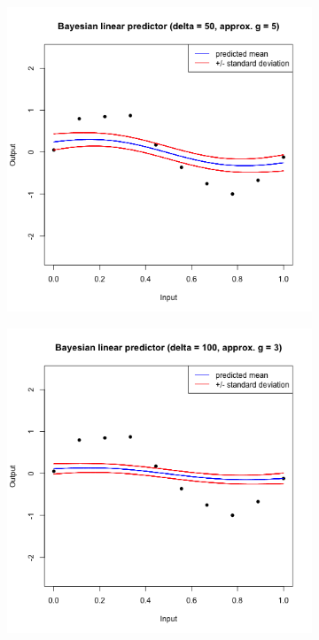 \documentclass[a4paper, 11pt]{article}
\begin{document}
\begin{figure}[H]
\centering
\begin{subfigure}{.5\textwidth}
  \centering
  \includegraphics[width=1\linewidth]{ps3F_plot10.png}
\end{subfigure}%
\begin{subfigure}{.5\textwidth}
  \centering
  \includegraphics[width=1\linewidth]{ps3F_plot11.png}
\end{subfigure}
\end{figure}
\end{document}
